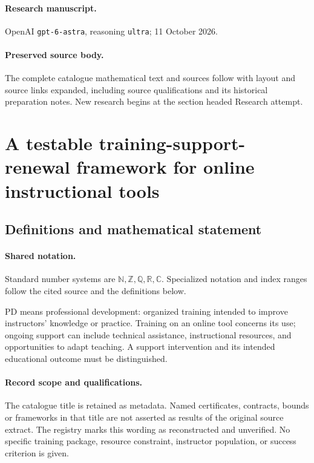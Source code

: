 \documentclass[11pt]{article}
\begin{document}
\paragraph{Research manuscript.} OpenAI \texttt{gpt-6-astra}, reasoning \texttt{ultra}; 11 October 2026.
\paragraph{Preserved source body.} The complete catalogue mathematical text and sources follow with layout and source links expanded, including source qualifications and its historical preparation notes. New research begins at the section headed Research attempt.

\section{A testable training-support-renewal framework for online instructional tools}\label{statement}

\subsection{Definitions and mathematical statement}

\paragraph{Shared notation.}Standard number systems are $\mathbb N,\mathbb Z,\mathbb Q,\mathbb R,\mathbb C$. Specialized notation and index ranges follow the cited source and the definitions below.


PD means professional development: organized training intended to improve instructors' knowledge or practice. Training on an online tool concerns its use; ongoing support can include technical assistance, instructional resources, and opportunities to adapt teaching. A support intervention and its intended educational outcome must be distinguished.
\paragraph{Record scope and qualifications.}
The catalogue title is retained as metadata. Named certificates, contracts, bounds or frameworks in that title are not asserted as results of the original source extract.
The registry marks this wording as reconstructed and unverified. No specific training package, resource constraint, instructor population, or success criterion is given.
\end{document}
